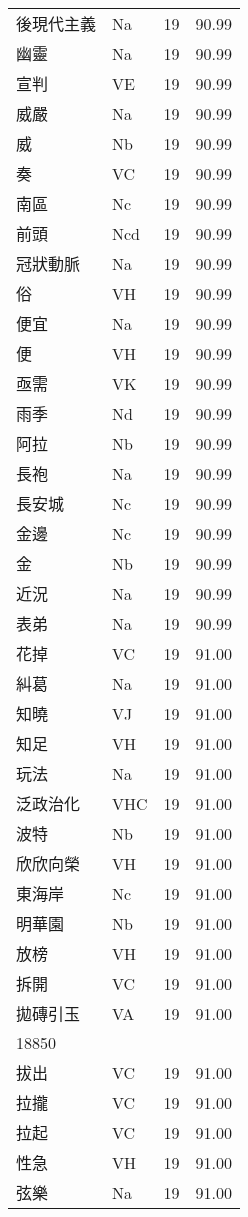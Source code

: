 \documentclass[twocolumn]{book}
\begin{document}
\begin{supertabular}{llrr}
後現代主義 & Na & 19 &  90.99\\
幽靈 & Na & 19 &  90.99\\
宣判 & VE & 19 &  90.99\\
威嚴 & Na & 19 &  90.99\\
威 & Nb & 19 &  90.99\\
奏 & VC & 19 &  90.99\\
南區 & Nc & 19 &  90.99\\
前頭 & Ncd & 19 &  90.99\\
冠狀動脈 & Na & 19 &  90.99\\
俗 & VH & 19 &  90.99\\
便宜 & Na & 19 &  90.99\\
便 & VH & 19 &  90.99\\
亟需 & VK & 19 &  90.99\\
雨季 & Nd & 19 &  90.99\\
阿拉 & Nb & 19 &  90.99\\
長袍 & Na & 19 &  90.99\\
長安城 & Nc & 19 &  90.99\\
金邊 & Nc & 19 &  90.99\\
金 & Nb & 19 &  90.99\\
近況 & Na & 19 &  90.99\\
表弟 & Na & 19 &  90.99\\
花掉 & VC & 19 &  91.00\\
糾葛 & Na & 19 &  91.00\\
知曉 & VJ & 19 &  91.00\\
知足 & VH & 19 &  91.00\\
玩法 & Na & 19 &  91.00\\
泛政治化 & VHC & 19 &  91.00\\
波特 & Nb & 19 &  91.00\\
欣欣向榮 & VH & 19 &  91.00\\
東海岸 & Nc & 19 &  91.00\\
明華園 & Nb & 19 &  91.00\\
放榜 & VH & 19 &  91.00\\
拆開 & VC & 19 &  91.00\\
拋磚引玉 & VA & 19 &  91.00\\
18850\\
拔出 & VC & 19 &  91.00\\
拉攏 & VC & 19 &  91.00\\
拉起 & VC & 19 &  91.00\\
性急 & VH & 19 &  91.00\\
弦樂 & Na & 19 &  91.00\\

\end{supertabular}
\end{document}
